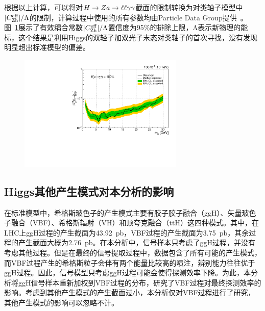 根据以上计算，可以将对$H\to Za\to\ell\ell\gamma\gamma$截面的限制转换为对类轴子模型中$|C_{\mathrm{Zh}}^{\mathrm{eff}}|/\Lambda$的限制，计算过程中使用的所有参数均由Particle Data Group提供~\cite{ParticleDataGroup:2020ssz}。图~\ref{fig:Czh}展示了有效耦合常数$|C_{\mathrm{Zh}}^{\mathrm{eff}}|/\Lambda$置信度为95\%的排除上限，$\mathrm{\Lambda}$表示新物理的能标，这个结果是利用Higgs的双轻子加双光子末态对类轴子的首次寻找，没有发现明显超出标准模型的偏差。

\begin{figure}[htbp]
  \begin{center}
		\includegraphics[width=0.7\textwidth]{Thesis (Version 2246)/figures/chapter04/ALP_c_zh_UpperLimit.pdf}
    \label{fig:Czh}
\end{center}
\end{figure}

\subsection{Higgs其他产生模式对本分析的影响}

在标准模型中，希格斯玻色子的产生模式主要有胶子胶子融合（ggH）、矢量玻色子融合（VBF）、希格斯辐射（VH）和顶夸克融合（ttH）这四种模式。其中，在LHC上ggH过程的产生截面为43.92~\si{pb}，VBF过程的产生截面为3.75~\si{pb}，其余过程的产生截面大概为2.76~\si{pb}。在本分析中，信号样本只考虑了ggH过程，并没有考虑其他过程。但是在最终的信号提取过程中，数据包含了所有可能的产生模式，而VBF过程产生的希格斯粒子会伴有两个能量比较高的喷注，辨别能力往往优于ggH过程。因此，信号模型只考虑ggH过程可能会使得探测效率下降。为此，本分析将ggH信号样本重新加权到VBF过程的分布，研究了VBF过程对最终探测效率的影响。考虑到其他产生模式的产生截面过小，本分析仅对VBF过程进行了研究，其他产生模式的影响可以忽略不计。

